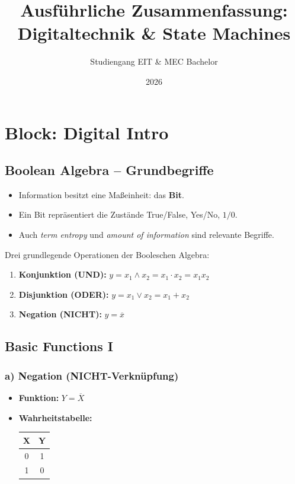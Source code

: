 \documentclass[11pt,a4paper]{article}
\title{Ausführliche Zusammenfassung: Digitaltechnik \& State Machines}
\author{Studiengang EIT \& MEC Bachelor}
\date{2026}
\begin{document}
\maketitle
\tableofcontents
\newpage

\section{Block: Digital Intro}

\subsection{Boolean Algebra -- Grundbegriffe}
\begin{itemize}
    \item Information besitzt eine Maßeinheit: das \textbf{Bit}.
    \item Ein Bit repräsentiert die Zustände True/False, Yes/No, $1/0$.
    \item Auch \emph{term entropy} und \emph{amount of information} sind relevante Begriffe.
\end{itemize}

Drei grundlegende Operationen der Booleschen Algebra:
\begin{enumerate}
    \item \textbf{Konjunktion (UND):} $y = x_1 \wedge x_2 = x_1 \cdot x_2 = x_1 x_2$
    \item \textbf{Disjunktion (ODER):} $y = x_1 \vee x_2 = x_1 + x_2$
    \item \textbf{Negation (NICHT):} $y = \overline{x}$
\end{enumerate}

\subsection{Basic Functions I}

\subsubsection{a) Negation (NICHT-Verknüpfung)}
\begin{itemize}
    \item \textbf{Funktion:} $Y = \overline{X}$
    \item \textbf{Wahrheitstabelle:}
    \begin{center}
    \begin{tabular}{cc}
        \toprule
        X & Y \\ \midrule
        0 & 1 \\
        1 & 0 \\ \bottomrule
    \end{tabular}
    \end{center}
\end{itemize}
\end{document}
